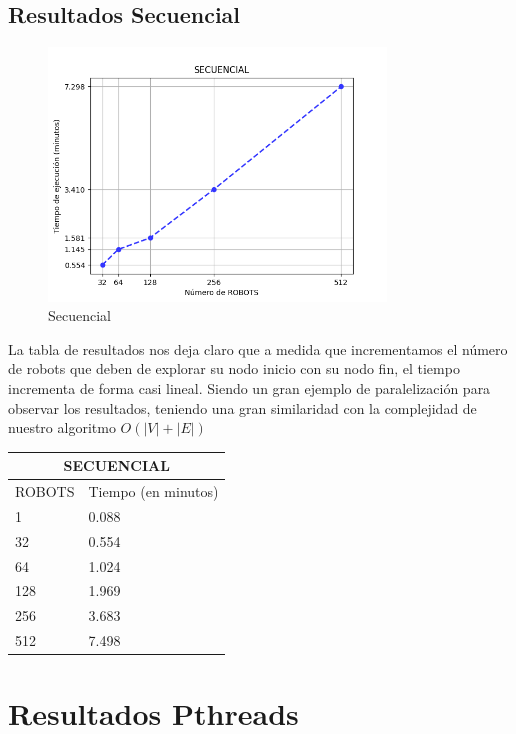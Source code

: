 \documentclass[oneside,twocolumn]{article}
\begin{document}
\newpage
\subsection{Resultados Secuencial}

\begin{figure}[h]
    \centering
    \includegraphics[width=0.80\textwidth]{graficos/secuencial/secuencial.png}
    \caption{Secuencial}
    \label{fig:secuencial}
\end{figure}

La tabla de resultados nos deja claro que a medida que incrementamos el número de robots que deben de explorar su nodo inicio con su nodo fin, el tiempo incrementa de forma casi lineal. Siendo un gran ejemplo de paralelización para observar los resultados, teniendo una gran similaridad con la complejidad de nuestro algoritmo $O(|V|+|E|)$

\begin{center}
\begin{tabular}{ |p{2cm}||p{4cm}| }
 \hline
 \multicolumn{2}{|c|}{SECUENCIAL} \\
 \hline
 ROBOTS & Tiempo (en minutos)\\
 \hline
 1    & 0.088\\
 \hline
 32   & 0.554\\ \hline
 64   & 1.024\\ \hline
 128  & 1.969\\ \hline
 256  & 3.683\\ \hline
 512  & 7.498\\ \hline
 \hline
\end{tabular}
\end{center}

\newpage
\onecolumn
\section{Resultados Pthreads}
\end{document}
